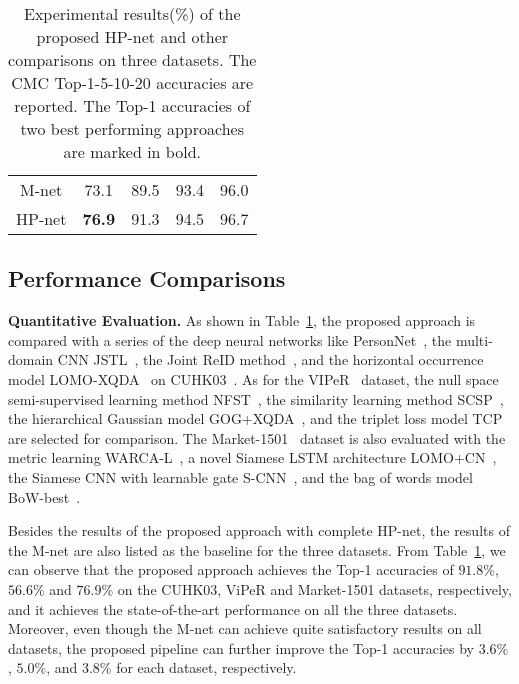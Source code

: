 \documentclass[10pt,twocolumn,letterpaper]{article}
\begin{document}
\begin{table}[t]
\begin{footnotesize}
\begin{center}
\begin{tabular}{c|cccc}
M-net & 73.1 & 89.5 & 93.4 & 96.0 \\
HP-net & \textbf{76.9} & 91.3 & 94.5 & 96.7 \\
\hline
\end{tabular}
\end{center}
\caption{Experimental results(\%) of the proposed HP-net and other comparisons on three datasets. The CMC Top-1-5-10-20 accuracies are reported. The Top-1 accuracies of two best performing approaches are marked in bold.}
\label{tab:accuracy}
\vspace{-0.1cm}
\end{footnotesize}
\end{table}




\subsection{Performance Comparisons}

\noindent\textbf{Quantitative Evaluation.}
%
As shown in Table~\ref{tab:accuracy}, the proposed approach is compared with a series of the deep neural networks like PersonNet~\cite{wu2016personnet}, the multi-domain CNN JSTL~\cite{xiao2016learning},
the Joint ReID method~\cite{ahmed2015improved}, and the horizontal occurrence model LOMO-XQDA~\cite{liao2015person} on CUHK03~\cite{li2014deepreid}.
%
As for the VIPeR~\cite{gray2007evaluating} dataset, the null space semi-supervised learning method NFST~\cite{zhang2016learning}, the similarity learning method SCSP~\cite{chen2016similarity}, the hierarchical Gaussian model GOG+XQDA~\cite{matsukawa2016hierarchical},
and the triplet loss model TCP~\cite{cheng2016person} are selected for comparison.
%
The Market-1501~\cite{zheng2015scalable} dataset is also evaluated with the metric learning WARCA-L~\cite{jose2016scalable}, a novel Siamese LSTM architecture LOMO+CN~\cite{varior2016siamese}, the Siamese CNN with learnable gate S-CNN~\cite{varior2016gated},
and the bag of words model BoW-best~\cite{zheng2015scalable}.

Besides the results of the proposed approach with complete HP-net, the results of the M-net are also listed as the baseline for the three datasets.
%
From Table~\ref{tab:accuracy}, we can observe that the proposed approach achieves the Top-1 accuracies of $91.8\%$, $56.6\%$ and $76.9\%$ on the CUHK03, ViPeR and Market-1501 datasets, respectively, and it achieves the state-of-the-art performance on all the three datasets.
%
Moreover, even though the M-net can achieve quite satisfactory results on all datasets, the proposed pipeline can further improve the Top-1 accuracies by $3.6\%$, $5.0\%$, and $3.8\%$ for each dataset, respectively.
%
\end{document}
